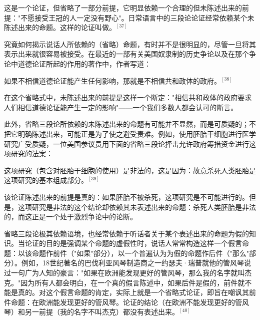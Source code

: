 这是一个论证，但省略了一部分前提，它明显依赖一个合理的但未陈述出来的前提："不愿接受王冠的人一定没有野心"。日常语言中的三段论论证经常依赖某个未陈述出来的命题。这样的论证叫做。${}^{[37]}$

究竟如何揭示说话人所依赖的（省略）命题，有时并不是很明显的，尽管一旦将其表示出来就很容易被接受。在最近的一部有关美国奴隶制的历史争论以及在那个争论中道德论证所起的作用的著作中，作者写道：

\begin{displayquote}
如果不相信道德论证能产生任何影响，那就是不相信共和政体的政府。${}^{[38]}$
\end{displayquote}

在这个省略式中，未陈述出来的前提是这样一个断定："相信共和政体的政府要求人们相信道德论证能产生一定的影响"——一个我们多数人都会认可的断言。

此外，省略三段论所依赖的未陈述出来的命题有可能并不显然，而是可质疑的；不把它明确陈述出来，可能正是为了使之避受责难。例如，使用胚胎干细胞进行医学研究广受质疑，一位美国参议员用下面的省略三段论抨击允许政府筹措资金进行这项研究的法案：

\begin{displayquote}
这项研究（包含对胚胎干细胞的使用）是非法的，这是因为：故意杀死人类胚胎是这项研究的基本组成部分。${}^{[39]}$
\end{displayquote}

该论证陈述出来的前提是真的：如果胚胎不被杀死，这项研究是不可能进行的。但是，这项研究是非法的这个结论却依赖其未表述出来的命题：杀死人类胚胎是非法的，而这正是一个处于激烈争论中的论断。

省略三段论极其依赖语境，也经常依赖于听话者关于某个表述出来的命题为假的知识。当论证的目的是强调某个命题的虚假性时，说话人常常构造这样一个假言命题：以该命题作前件（"如果"部分），以一个普遍认为为假的命题作后件（"那么"部分）。例如，18世纪著名的巴伐利亚风琴制造商之一约瑟夫·瑞普就他的管风琴说过一句广为人知的豪言："如果在欧洲能发现更好的管风琴，那么我的名字就叫杰克。"因为所有人都会明白，在一个真的假言陈述中，如果后件是假的，前件就不能是真的。对这个假言命题的肯定，实际上就是一个省略式论证，即旨在嘲讽其前件命题：在欧洲能发现更好的管风琴。论证的结论（在欧洲不能发现更好的管风琴）和另一前提（我的名字不叫杰克）都没有表述出来。${}^{[40]}$

